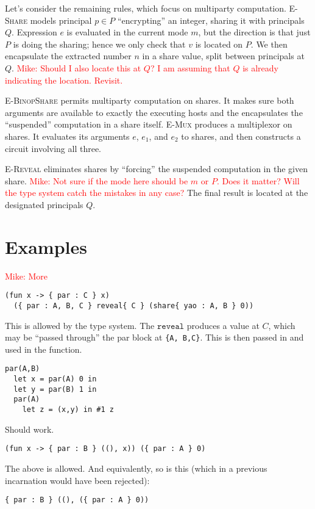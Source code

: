 \documentclass[10pt]{article}
\newcommand{\rulelab}[1]{{\small \textsc{#1}}}
\newcommand{\kw}[1]{\ensuremath{\mathtt{#1}}}
\newcommand{\mwh}[1]{\textcolor{red}{Mike: #1}}
\begin{document}
Let's consider the remaining rules, which focus on multiparty
computation. \rulelab{E-Share} models principal $p \in P$
``encrypting'' an integer, sharing it with principals $Q$. Expression
$e$ is evaluated in the current mode $m$, but the direction is that
just $P$ is doing the sharing; hence we only check that $v$ is located
on $P$. We then encapsulate the extracted number $n$ in a share value,
split between principals at $Q$. \mwh{Should I also locate this at
  $Q$? I am assuming that $Q$ is already indicating the
  location. Revisit.}

\rulelab{E-BinopShare} permits multiparty computation on shares. It
makes sure both arguments are available to exactly the executing hosts
and the encapsulates the ``suspended'' computation in a share
itself. \rulelab{E-Mux} produces a multiplexor on shares. It evaluates
its arguments $e$, $e_1$, and $e_2$ to shares, and then constructs a
circuit involving all three.

\rulelab{E-Reveal} eliminates shares by ``forcing'' the suspended
computation in the given share. \mwh{Not sure if the mode here should
  be $m$ or $P$. Does it matter? Will the type system catch the
  mistakes in any case?} The final result is located at the designated
principals $Q$. 

\section{Examples}

\mwh{More}

\begin{verbatim}
(fun x -> { par : C } x) 
  ({ par : A, B, C } reveal{ C } (share{ yao : A, B } 0))
\end{verbatim}
This is allowed by the type system. The $\kw{reveal}$ produces a value
at $C$, which may be ``passed through'' the par block at \verb+{A, B,C}+. 
This is then passed in and used in the function.

\begin{verbatim}
par(A,B) 
  let x = par(A) 0 in
  let y = par(B) 1 in
  par(A) 
    let z = (x,y) in #1 z
\end{verbatim}
Should work.

\begin{verbatim}
(fun x -> { par : B } ((), x)) ({ par : A } 0)
\end{verbatim}
The above is allowed. And equivalently, so is this (which in a
previous incarnation would have been rejected):
\begin{verbatim}
{ par : B } ((), ({ par : A } 0))
\end{verbatim}
\end{document}
